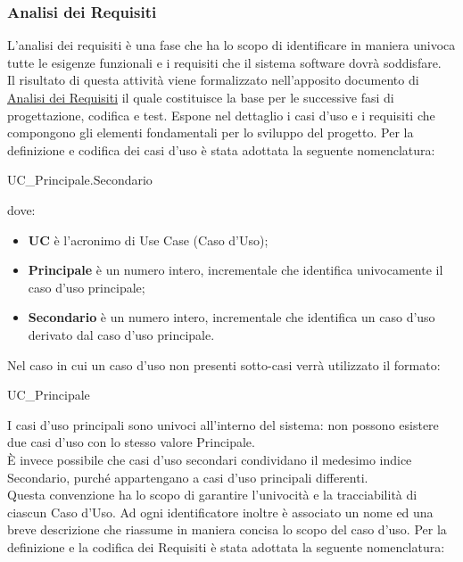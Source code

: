 	\subsubsection{Analisi dei Requisiti}
	L’analisi dei requisiti è una fase che ha lo scopo di identificare in maniera univoca tutte le esigenze funzionali e i requisiti che il sistema software dovrà soddisfare.\\
	Il risultato di questa attività viene formalizzato nell’apposito documento di \href{https://nullpointersgroup.github.io/Documentazione/output/RTB/Documenti%20Esterni/Analisi_dei_Requisiti.pdf}{Analisi dei Requisiti} il quale costituisce la base per le successive fasi di progettazione, codifica e test. 
	Espone nel dettaglio i casi d’uso e i requisiti che compongono gli elementi fondamentali per lo sviluppo del progetto.
		Per la definizione e codifica dei casi d’uso è stata adottata la seguente nomenclatura:
		\begin{center} UC\_Principale.Secondario \end{center}
		dove:
		\begin{itemize}[itemsep=3pt, parsep=1pt, label=$\scriptstyle\bullet$]
			\item \textbf{UC} è l’acronimo di Use Case (Caso d’Uso);
			\item  \textbf{Principale} è un numero intero, incrementale che identifica univocamente il caso d’uso principale;
			\item \textbf{Secondario} è un numero intero, incrementale che identifica un caso d’uso derivato dal caso d’uso principale.
		\end{itemize}
		Nel caso in cui un caso d’uso non presenti sotto-casi verrà utilizzato il formato:
		\begin{center} UC\_Principale \end{center}
		I casi d’uso principali sono univoci all’interno del sistema: non possono esistere due casi d’uso con lo stesso valore Principale.\\
		È invece possibile che casi d’uso secondari condividano il medesimo indice Secondario, purché appartengano a casi d’uso principali differenti.\\
		Questa convenzione ha lo scopo di garantire l’univocità e la tracciabilità di ciascun Caso d’Uso. Ad ogni identificatore inoltre è associato un nome ed una breve descrizione che riassume in maniera concisa lo scopo del caso d’uso.
		Per la definizione e la codifica dei Requisiti è stata adottata la seguente nomenclatura:
